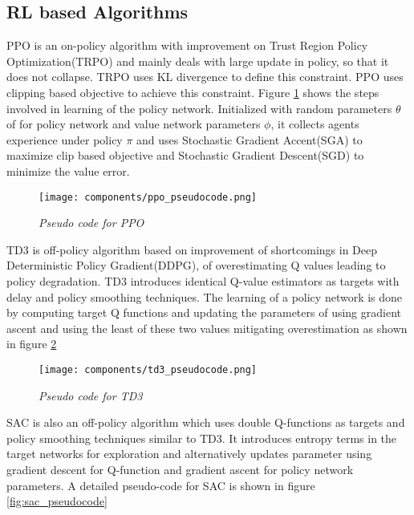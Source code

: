 \begin{large}
\section*{RL based Algorithms}

PPO is an on-policy algorithm with improvement on Trust Region Policy Optimization(TRPO) \cite{trpo} and mainly deals with large update in policy, so that it does not collapse. TRPO uses KL divergence to define this constraint. PPO uses clipping based objective to achieve this constraint. Figure \ref{fig:ppo_pseudocode} shows the steps involved in learning of the policy network. Initialized with random parameters $\theta$ of for policy network and value network parameters $\phi$, it collects agents experience under policy $\pi$ and uses Stochastic Gradient Accent(SGA) to maximize clip based objective and Stochastic Gradient Descent(SGD) to minimize the value error. 

\begin{figure}[h]
	\begin{center}
		\texttt{[image: components/ppo\_pseudocode.png]}
		\caption{ \textit{Pseudo code for PPO}}
		\label{fig:ppo_pseudocode}
	\end{center}
\end{figure}

TD3 is off-policy algorithm based on improvement of shortcomings in  Deep Deterministic Policy Gradient(DDPG)\cite{ddpg}, of overestimating Q values leading to policy degradation. TD3 introduces identical Q-value estimators as targets with delay and policy smoothing techniques. The learning of a policy network is done by computing target Q functions and updating the parameters of using  gradient ascent and using the least of these two values mitigating overestimation as shown in figure \ref{fig:td3_pseudocode} \\

\begin{figure}[h]
	\begin{center}
		\texttt{[image: components/td3\_pseudocode.png]}
		\caption{ \textit{Pseudo code for TD3}}
		\label{fig:td3_pseudocode}
	\end{center}
\end{figure}

SAC is also an off-policy algorithm which uses double Q-functions as targets and policy smoothing techniques similar to TD3. It introduces entropy terms in the target networks for exploration and alternatively updates parameter using gradient descent for Q-function and gradient ascent for policy network parameters. A detailed pseudo-code for SAC is shown in figure \ref{fig:sac_pseudocode} \\



\end{large}
